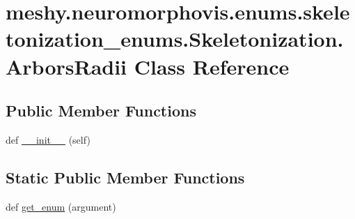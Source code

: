 \hypertarget{classmeshy_1_1neuromorphovis_1_1enums_1_1skeletonization__enums_1_1Skeletonization_1_1ArborsRadii}{}\section{meshy.\+neuromorphovis.\+enums.\+skeletonization\+\_\+enums.\+Skeletonization.\+Arbors\+Radii Class Reference}
\label{classmeshy_1_1neuromorphovis_1_1enums_1_1skeletonization__enums_1_1Skeletonization_1_1ArborsRadii}


 


\subsection*{Public Member Functions}
\begin{DoxyCompactItemize}
\item 
def \hyperlink{classmeshy_1_1neuromorphovis_1_1enums_1_1skeletonization__enums_1_1Skeletonization_1_1ArborsRadii_a32406fed24bec53ba796862ff33ae3a4}{\+\_\+\+\_\+init\+\_\+\+\_\+} (self)\hypertarget{classmeshy_1_1neuromorphovis_1_1enums_1_1skeletonization__enums_1_1Skeletonization_1_1ArborsRadii_a32406fed24bec53ba796862ff33ae3a4}{}\label{classmeshy_1_1neuromorphovis_1_1enums_1_1skeletonization__enums_1_1Skeletonization_1_1ArborsRadii_a32406fed24bec53ba796862ff33ae3a4}

\end{DoxyCompactItemize}
\subsection*{Static Public Member Functions}
\begin{DoxyCompactItemize}
\item 
def \hyperlink{classmeshy_1_1neuromorphovis_1_1enums_1_1skeletonization__enums_1_1Skeletonization_1_1ArborsRadii_a4c2a2a595008956d65b1127564ac5caf}{get\+\_\+enum} (argument)\hypertarget{classmeshy_1_1neuromorphovis_1_1enums_1_1skeletonization__enums_1_1Skeletonization_1_1ArborsRadii_a4c2a2a595008956d65b1127564ac5caf}{}\label{classmeshy_1_1neuromorphovis_1_1enums_1_1skeletonization__enums_1_1Skeletonization_1_1ArborsRadii_a4c2a2a595008956d65b1127564ac5caf}

\end{DoxyCompactItemize}
